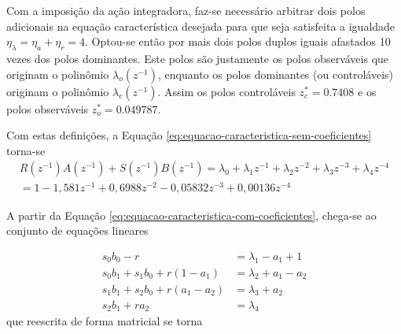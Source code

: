 Com a imposição da ação integradora, faz-se necessário arbitrar dois polos
adicionais na equação característica desejada para que seja satisfeita a
igualdade $\eta_\lambda = \eta_a + \eta_r = 4$. Optou-se então por mais dois
polos duplos iguais afastados 10 vezes dos polos dominantes. Este polos são
justamente os polos observáveis que originam o polinômio
$\lambda_o(z^{-1})$, enquanto os polos dominantes (ou controláveis)
originam o polinômio $\lambda_c(z^{-1})$. Assim os polos controláveis $z_{c}^{*}
= 0.7408$ e os polos observáveis $z_{o}^{*} = 0.049787$.

Com estas definições, a Equação \ref{eq:equacao-caracteristica-sem-coeficientes}
torna-se
\begin{equation}
    \label{eq:equacao-caracteristica-com-coeficientes}
    \begin{split}
        R(z^{-1})A(z^{-1})+S(z^{-1})B(z^{-1})
        = \lambda_0+\lambda_1z^{-1}+\lambda_2z^{-2}+\lambda_3z^{-3}+\lambda_4z^{-4} \\
        = 1-1,581z^{-1}+0,6988z^{-2}-0,05832z^{-3}+0,00136z^{-4}
    \end{split}
\end{equation}

A partir da Equação \ref{eq:equacao-caracteristica-com-coeficientes}, chega-se
ao conjunto de equações lineares

\begin{equation}
    \label{eq:sistema-de-equacoes-lineares}
    \begin{split}
        s_0b_0 - r &= \lambda_1-a_1+1\\ 
        s_0b_1 + s_1b_0 + r(1-a_1) &= \lambda_2+a_1-a_2 \\ 
        s_1b_1 + s_2b_0 + r(a_1-a_2) &= \lambda_3+a_2 \\  
        s_2b_1 + ra_2 &= \lambda_4 
    \end{split}
\end{equation} que reescrita de forma matricial se torna

